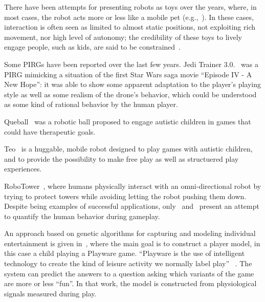 There have been attempts for presenting robots as toys over the years, where, in most cases, the robot acts more or less like a mobile pet (e.g.,~\cite{fujita_open_1997, brooks_robots_2004}). In these cases, interaction is often seen as limited to almost static positions, not exploiting rich movement, nor high level of autonomy; the credibility of these toys to lively engage people, such as kids, are said to be constrained~\cite{martinoia_physically_2013, bonarini_timing_2014}. 

Some PIRGs have been reported over the last few years. Jedi Trainer 3.0.~\cite{martinoia_physically_2013} was a PIRG mimicking a situation of the first Star Wars saga movie ``Episode IV - A New Hope'': it was able to show some apparent adaptation to the player's playing style as well as some realism of the drone's behavior, which could be understood as some kind of rational behavior by the human player.

Queball~\cite{salter_designing_2014} was a robotic ball proposed to engage autistic children in games that could have therapeutic goals.

Teo~\cite{bonarini_huggable_2016} is a huggable, mobile robot designed to play games with autistic children, and to provide the possibility to make free play as well as structuered play experiences.

RoboTower~\cite{oliveira_learning_2018, oliveira_activity_2017, oliveira_modeling_2017}, where humans physically interact with an omni-directional robot by trying to protect towers while avoiding letting the robot pushing them down.
Despite being examples of successful applications, only~\cite{oliveira_modeling_2017} and~\cite{oliveira_learning_2018} present an attempt to quantify the human behavior during gameplay.%

An approach based on genetic algorithms for capturing and modeling individual entertainment is given in~\cite{yannakakis_entertainment_2008}, where the main goal is to construct a player model, in this case a child playing a Playware game. ``Playware is the use of intelligent technology to create the kind of leisure activity we normally label play''%
~\cite{lund_playware_2005}. The system can predict the answers to a question asking which variants of the game are more or less ``fun''. In that work, the model is constructed from physiological signals measured during play. 

